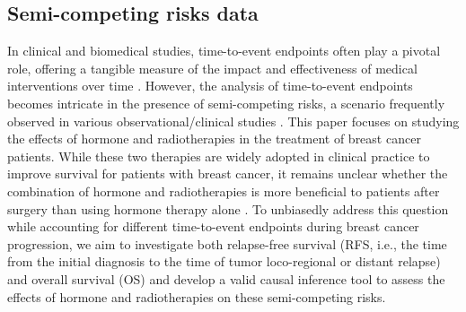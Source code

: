 \documentclass[12pt]{article}
\theoremstyle{plain}
\begin{document}
\subsection{Semi-competing risks data}
 In clinical and biomedical studies, time-to-event endpoints often play a pivotal role, offering a tangible measure of the impact and effectiveness of medical interventions over time \citep{cohen2022clinical}. 
However, the analysis of time-to-event endpoints becomes intricate in the presence of semi-competing risks, a scenario frequently observed in various observational/clinical studies \citep{mao2021statistical}. This paper focuses on studying the effects of hormone and radiotherapies in the treatment of breast cancer patients. While these two therapies are widely adopted in clinical practice to improve survival for patients with breast cancer, it remains unclear whether the combination of hormone and radiotherapies is more beneficial to patients after surgery than using hormone therapy alone \citep{mayer2014,mcduff2022optimizing}. To unbiasedly address this question while accounting for different time-to-event endpoints during breast cancer progression, we aim to investigate both relapse-free survival (RFS, i.e., the time from the initial diagnosis to the time of tumor loco-regional or distant relapse) and overall survival (OS) and develop a valid causal inference tool to assess the effects of hormone and radiotherapies on these semi-competing risks.
\end{document}
